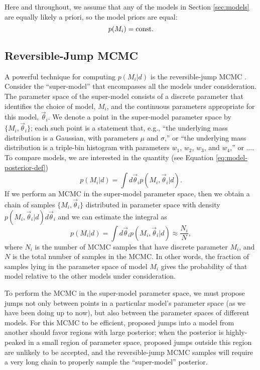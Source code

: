 \documentclass[preprint]{aastex}
\newcommand{\vtheta}{\vec{\theta}}
\begin{document}
Here and throughout, we assume that any of the models in Section
\ref{sec:models} are equally likely a priori, so the model priors are
equal:
\begin{equation}
  p(M_i) = \textnormal{const}.
\end{equation}

\subsection{Reversible-Jump MCMC}
\label{sec:reversible-jump-mcmc}

A powerful technique for computing $p(M_i|d)$ is the reversible-jump
MCMC \citep{Green1995}.  Consider the ``super-model'' that encompasses
all the models under consideration.  The parameter space of the
super-model consists of a discrete parameter that identifies the
choice of model, $M_i$, and the continuous parameters appropriate for
this model, $\vtheta_i$.  We denote a point in the super-model
parameter space by $\{M_i, \vtheta_i\}$; each such point is a
statement that, e.g., ``the underlying mass distribution is a
Gaussian, with parameters $\mu$ and $\sigma$,'' or ``the underlying
mass distribution is a triple-bin histogram with parameters $w_1$,
$w_2$, $w_3$, and $w_4$,'' or ....  To compare models, we are
interested in the quantity (see Equation
\eqref{eq:model-posterior-def})
\begin{equation}
  p(M_i|d) = \int d\vtheta_i p(M_i, \vtheta_i|d).
\end{equation}
If we perform an MCMC in the super-model parameter space, then we
obtain a chain of samples $\{M_i, \vtheta_i\}$ distributed in
parameter space with density $p(M_i,\vtheta_i|d) d\vtheta_i$ and we can
estimate the integral as
\begin{equation}
  p(M_i|d) = \int d\vtheta_i p(M_i, \vtheta_i|d) \approx \frac{N_i}{N},
\end{equation}
where $N_i$ is the number of MCMC samples that have discrete parameter
$M_i$, and $N$ is the total number of samples in the MCMC.  In other
words, the fraction of samples lying in the parameter space of model
$M_i$ gives the probability of that model relative to the other models
under consideration.

To perform the MCMC in the super-model parameter space, we must
propose jumps not only between points in a particular model's
parameter space (as we have been doing up to now), but also between
the parameter spaces of different models.  For this MCMC to be
efficient, proposed jumps into a model from another should favor
regions with large posterior; when the posterior is highly-peaked in a
small region of parameter space, proposed jumps outside this region
are unlikely to be accepted, and the reversible-jump MCMC samples will
require a very long chain to properly sample the ``super-model''
posterior.  
\end{document}
